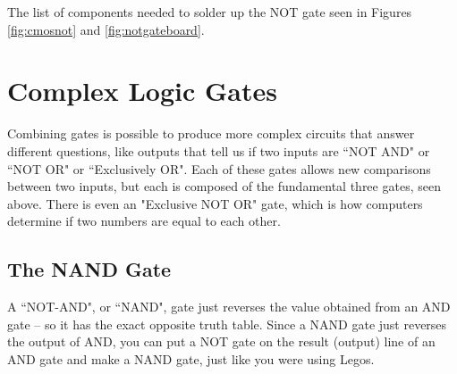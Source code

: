 \begin{table}

\caption{The list of components needed to solder up the NOT gate seen in Figures \ref{fig:cmosnot} and \ref{fig:notgateboard}.}

\end{table}

\clearpage
\newpage

\section{Complex Logic Gates}

Combining gates is possible to produce more complex circuits that answer different questions, like outputs that tell us if two inputs are ``NOT AND" or ``NOT OR" or ``Exclusively OR". Each of these gates allows new comparisons between two inputs, but each is composed of the fundamental three gates, seen above. There is even an "Exclusive NOT OR" gate, which is how computers determine if two numbers are equal to each other.

\subsection*{The NAND Gate}

A ``NOT-AND", or ``NAND", gate just reverses the value obtained from an AND gate -- so it has the exact opposite truth table. Since a NAND gate just reverses the output of AND, you can put a NOT gate on the result (output) line of an AND gate and make a NAND gate, just like you were using Legos.


